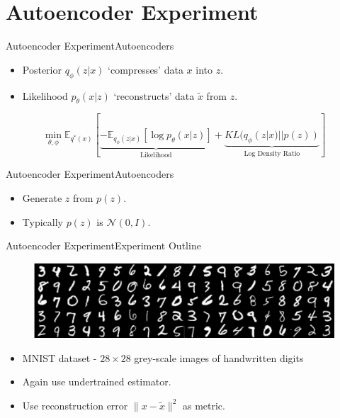 \documentclass[handout]{beamer}
\newcommand{\E}{\mathbb{E}}
\begin{document}
\section{Autoencoder Experiment}
\begin{frame}{Autoencoder Experiment}{Autoencoders}
\begin{itemize}
\item Posterior $q_\phi(z|x)$ `compresses' data $x$ into $z$.
\item Likelihood $p_\theta(x|z)$ `reconstructs' data $\tilde{x}$ from $z$.
\end{itemize}
\begin{figure}[h]
  \centering
\end{figure}
\[\min_{\theta, \phi} \E_{q^*(x)}[\underbrace{-\mathbb{E}_{q_\phi(z|x)}[\log p_\theta(x|z)]}_{\text{Likelihood}}+\underbrace{KL(q_\phi(z|x)||p(z))}_{\text{Log Density Ratio}}]\]
\end{frame}
\begin{frame}{Autoencoder Experiment}{Autoencoders}
\begin{itemize}
\item Generate $z$ from $p(z)$.
\item Typically $p(z)$ is $\mathcal{N}(0,I)$.
\end{itemize}
\begin{figure}[h]
  \centering
\end{figure}
\end{frame}
\begin{frame}{Autoencoder Experiment}{Experiment Outline}
\begin{figure}
\includegraphics[width=\linewidth]{mnist-digits-small.png}
\end{figure}
\begin{itemize}
\item MNIST dataset - $28\times 28$ grey-scale images of handwritten digits
\vspace{0.3cm}
\item Again use undertrained estimator.
\vspace{0.3cm}
\item Use reconstruction error $\|x-\tilde{x}\|^2$ as metric.
\end{itemize}
\end{frame}
\end{document}
